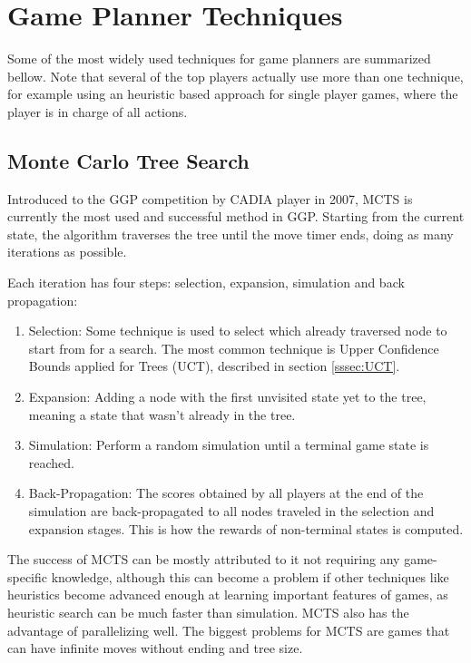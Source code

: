 \section{Game Planner Techniques}

Some of the most widely used techniques for game planners are summarized bellow. Note that several of the top players actually use more than one technique, for example using an heuristic based approach for single player games, where the player is in charge of all actions.


\subsection{Monte Carlo Tree Search}
Introduced to the GGP competition by CADIA player in 2007, \gls{MCTS} is currently the most used and successful method in GGP. Starting from the current state, the algorithm traverses the tree until the move timer ends, doing as many iterations as possible.

Each iteration has four steps: selection, expansion, simulation and back propagation:

\begin{enumerate}

\item Selection: Some technique is used to select which already traversed node to start from for a search. The most common technique is Upper Confidence Bounds applied for Trees (UCT), described in section \ref{sssec:UCT}.

\item Expansion: Adding a node with the first unvisited state yet to the tree, meaning a state that wasn’t already in the tree.

\item Simulation: Perform a random simulation until a terminal game state is reached.

\item Back-Propagation: The scores obtained by all players at the end of the simulation are back-propagated to all nodes traveled in the selection and expansion stages. This is how the rewards of non-terminal states is computed.

\end{enumerate}

The success of MCTS can be mostly attributed to it not requiring any game-specific knowledge, although this can become a problem if other techniques like heuristics become advanced enough at learning important features of games, as heuristic search can be much faster than simulation. MCTS also has the advantage of parallelizing well. The biggest problems for MCTS are games that can have infinite moves without ending and tree size.

